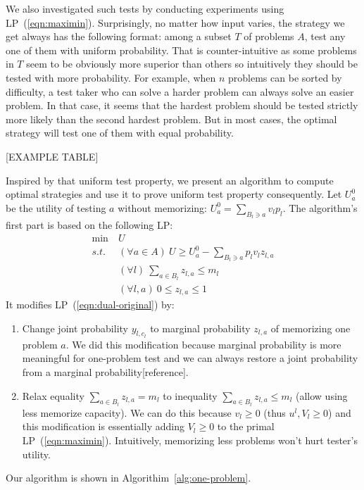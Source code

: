 \documentclass{article}
\begin{document}
We also investigated such tests by conducting experiments using
LP~(\ref{eqn:maximin}). Surprisingly, no matter how input varies, the strategy
we get always has the following format: among a subset $T$ of problems $A$,
test any one of them with uniform probability. That is counter-intuitive as
some problems in $T$ seem to be obviously more superior than others so
intuitively they should be tested with more probability. For example, when $n$
problems can be sorted by difficulty, a test taker who can solve a harder
problem can always solve an easier problem. In that case, it seems that the
hardest problem should be tested strictly more likely than the second hardest
problem. But in most cases, the optimal strategy will test one of them with
equal probability.

[EXAMPLE TABLE]

Inspired by that uniform test property, we present an algorithm to compute
optimal strategies and use it to prove uniform test property consequently.  Let
$U^0_a$ be the utility of testing $a$ without memorizing: $U^0_a =
\sum_{B_l \ni a} v_l p_l$. The algorithm's first part is based on
the following LP:
\begin{align}\label{eqn:one-problem}
	\min~ &U\\
	s.t.~ &(\forall a \in A)~ U \geq U^0_a - \sum_{B_l \ni a} p_l v_l z_{l, a}\nonumber\\
	&(\forall l)~ \sum_{a \in B_l} z_{l, a} \leq m_l\nonumber\\
	&(\forall l, a)~ 0 \leq z_{l, a} \leq 1\nonumber
\end{align}
It modifies LP~(\ref{eqn:dual-original}) by:
\begin{enumerate}
	\item Change joint probability $y_{l, c_l}$ to marginal probability
	$z_{l, a}$ of memorizing one problem $a$.  We did this modification
	because marginal probability is more meaningful for one-problem test
	and we can always restore a joint probability from a marginal
	probability[reference].
	\item Relax equality $\sum_{a \in B_l} z_{l, a} = m_l$ to inequality
	$\sum_{a \in B_l} z_{l,a} \leq m_l$ (allow using less memorize
	capacity).  We can do this because $v_l \geq 0$ (thus $u^l, V_l \geq
	0$) and this modification is essentially adding $V_l \geq 0$ to the
	primal LP~(\ref{eqn:maximin}). Intuitively, memorizing less problems
	won't hurt tester's utility.
\end{enumerate}

Our algorithm is shown in Algorithim~\ref{alg:one-problem}.
\end{document}
